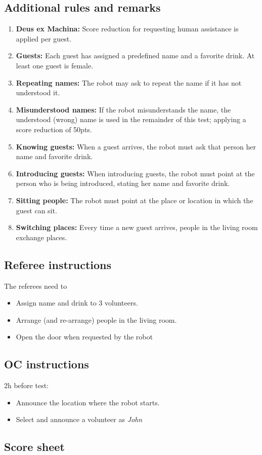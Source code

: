 \subsection{Additional rules and remarks}
\begin{enumerate}[nosep]
	\item \textbf{Deus ex Machina:} Score reduction for requesting human assistance is applied per guest.

	\item \textbf{Guests:} Each guest has assigned a predefined name and a favorite drink. At least one guest is female.

	\item \textbf{Repeating names:} The robot may ask to repeat the name if it has not understood it.

	\item \textbf{Misunderstood names:} If the robot misunderstands the name, the understood (wrong) name is used in the remainder of this test; applying a score reduction of 50pts.

	\item \textbf{Knowing guests:} When a guest arrives, the robot must ask that person her name and favorite drink.

	\item \textbf{Introducing guests:} When introducing guests, the robot must point at the person who is being introduced, stating her name and favorite drink.

	\item \textbf{Sitting people:} The robot must point at the place or location in which the guest can sit.

	\item \textbf{Switching places:} Every time a new guest arrives, people in the living room exchange places.
\end{enumerate}


\subsection{Referee instructions}

The referees need to
\begin{itemize}
	\item Assign name and drink to 3 volunteers.
	\item Arrange (and re-arrange) people in the living room.
	\item Open the door when requested by the robot
\end{itemize}

\subsection{OC instructions}

2h before test:
\begin{itemize}
	\item Announce the location where the robot starts.
	\item Select and announce a volunteer as \emph{John}
\end{itemize}

\subsection{Score sheet}


